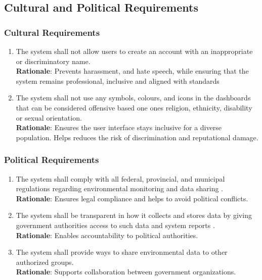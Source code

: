 \documentclass[]{article}
\begin{document}

\subsection{Cultural and Political Requirements}
\label{sub:cultural_and_political_requirements}

\subsubsection{Cultural Requirements}
\label{ssub:cultural_requirements}
\begin{enumerate}[{CP-C}1. ]
	\item The system shall not allow users to create an account with an inappropriate or discriminatory name. \\
    \textbf{Rationale}: Prevents harassment, and hate speech, while ensuring that the system remains professional, inclusive and aligned with standards

    \item The system shall not use any symbols, colours, and icons in the dashboards that can be considered offensive based one ones religion, ethnicity, disability or sexual orientation.  \\
    \textbf{Rationale}: Ensures the user interface stays inclusive for a diverse population. Helps reduces the risk of discrimination and reputational damage.
\end{enumerate}

\subsubsection{Political Requirements}
\label{ssub:political_requirements}
\begin{enumerate}[{CP-P}1. ]
	\item The system shall comply with all federal, provincial, and municipal regulations regarding environmental monitoring and data sharing \cite{canEnv}. \\
    \textbf{Rationale}: Ensures legal compliance and helps to avoid political conflicts.
    	
    \item The system shall be transparent in how it collects and stores data by giving government authorities access to such data and system reports \cite{canDirective}. \\
    \textbf{Rationale}: Enables accountability to political authorities. 
        	
    \item The system shall provide ways to share environmental data to other authorized groups. \\
    \textbf{Rationale}: Supports collaboration between government organizations.
\end{enumerate}
\end{document}
